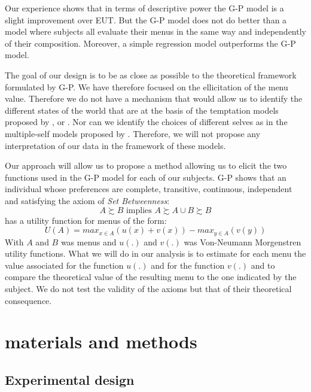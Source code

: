 \documentclass[
]{book}
\begin{document}
Our experience shows that in terms of descriptive power the G-P model is a
slight improvement over EUT.
But the G-P model does not do better than a model where subjects all evaluate
their menus in the same way and independently of their composition.
Moreover, a simple regression model outperforms the G-P model.

The goal of our design is to be as close as possible to the theoretical
framework formulated by G-P. We have therefore focused on the ellicitation of
the menu value.
Therefore we do not have a mechanism that would allow us to identify the
different states of the world that are at the basis of the temptation models
proposed by \citet{dekel2001representing}, \citet{dekel2007representing} or
\citet{dekel2009temptation}.
Nor can we identify the choices of different selves as in the multiple-self
models proposed by \citet{fudenberg2006dual}.
Therefore, we will not propose any interpretation of our data in the framework
of these models.

Our approach will allow us to propose a method allowing us to elicit the two
functions used in the G-P model for each of our subjects.
G-P shows that an individual whose preferences are complete, transitive,
continuous, independent and satisfying the axiom of \emph{Set Betweenness}:
\[
A \succsim B \text{ implies } A \succsim A\cup B \succsim B
\]
has a utility function for menus of the form:
\[
U(A) = max_{x \in A}(u(x) + v(x)) - max_{y \in A}(v(y))
\]
With \(A\) and \(B\) was menus and \(u(.)\) and \(v(.)\) was Von-Neumann Morgenstren
utility functions.
What we will do in our analysis is to estimate for each menu the value
associated for the function \(u(.)\) and for the function \(v(.)\) and to compare
the theoretical value of the resulting menu to the one indicated by the subject.
We do not test the validity of the axioms but that of their theoretical
consequence.

\hypertarget{mm3}{%
\section{materials and methods}\label{mm3}}

\hypertarget{experimental-design}{%
\subsection{Experimental design}\label{experimental-design}}
\end{document}
